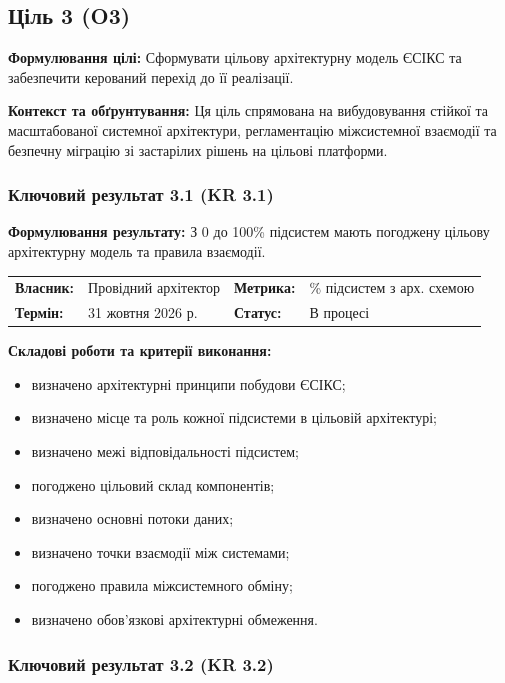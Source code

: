\documentclass{article}
\begin{document}
\newpage

\subsection{Ціль 3 (O3)}

\textbf{Формулювання цілі:} Сформувати цільову архітектурну модель ЄСІКС та забезпечити керований перехід до її реалізації.

\textbf{Контекст та обґрунтування:}
Ця ціль спрямована на вибудовування стійкої та масштабованої системної архітектури, регламентацію міжсистемної взаємодії та безпечну міграцію зі застарілих рішень на цільові платформи.

\subsubsection{Ключовий результат 3.1 (KR 3.1)}

\textbf{Формулювання результату:} З 0 до 100\% підсистем мають погоджену цільову архітектурну модель та правила взаємодії.

\noindent\begin{tabular}{@{}p{2.2cm}p{4.5cm}p{2.2cm}p{4.5cm}@{}}
\toprule
\textbf{Власник:} & Провідний архітектор & \textbf{Метрика:} & \% підсистем з арх. схемою \\
\textbf{Термін:} & 31 жовтня 2026 р. & \textbf{Статус:} & В процесі \\
\bottomrule
\end{tabular}

\vspace{10pt}
\textbf{Складові роботи та критерії виконання:}
\begin{itemize}
    \item визначено архітектурні принципи побудови ЄСІКС;
    \item визначено місце та роль кожної підсистеми в цільовій архітектурі;
    \item визначено межі відповідальності підсистем;
    \item погоджено цільовий склад компонентів;
    \item визначено основні потоки даних;
    \item визначено точки взаємодії між системами;
    \item погоджено правила міжсистемного обміну;
    \item визначено обов’язкові архітектурні обмеження.
\end{itemize}

\subsubsection{Ключовий результат 3.2 (KR 3.2)}
\end{document}
